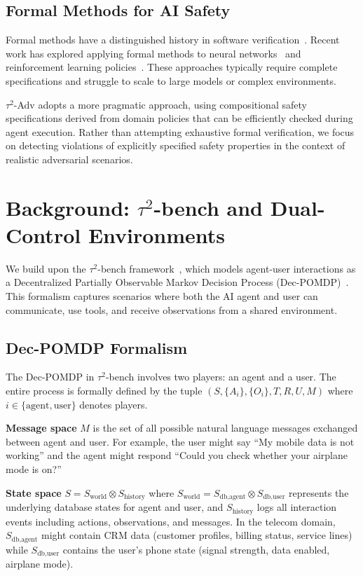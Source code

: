 \documentclass{article}
\newcommand{\tauadv}{$\tau^2$-Adv}
\newcommand{\taubench}{$\tau^2$-bench}
\begin{document}
\subsection{Formal Methods for AI Safety}

Formal methods have a distinguished history in software verification~\cite{clarke1999model,hoare1969axiomatic}. Recent work has explored applying formal methods to neural networks~\cite{katz2017reluplex,singh2019abstract} and reinforcement learning policies~\cite{alshiekh2018safe,jansen2020safe}. These approaches typically require complete specifications and struggle to scale to large models or complex environments.

\tauadv{} adopts a more pragmatic approach, using compositional safety specifications derived from domain policies that can be efficiently checked during agent execution. Rather than attempting exhaustive formal verification, we focus on detecting violations of explicitly specified safety properties in the context of realistic adversarial scenarios.

\section{Background: \taubench{} and Dual-Control Environments}

We build upon the \taubench{} framework~\cite{barres2025tau2}, which models agent-user interactions as a Decentralized Partially Observable Markov Decision Process (Dec-POMDP)~\cite{oliehoek2016concise}. This formalism captures scenarios where both the AI agent and user can communicate, use tools, and receive observations from a shared environment.

\subsection{Dec-POMDP Formalism}

The Dec-POMDP in \taubench{} involves two players: an agent and a user. The entire process is formally defined by the tuple $(S, \{A_i\}, \{O_i\}, T, R, U, M)$ where $i \in \{\text{agent}, \text{user}\}$ denotes players.

\textbf{Message space} $M$ is the set of all possible natural language messages exchanged between agent and user. For example, the user might say ``My mobile data is not working'' and the agent might respond ``Could you check whether your airplane mode is on?''

\textbf{State space} $S = S_{\text{world}} \otimes S_{\text{history}}$ where $S_{\text{world}} = S_{\text{db,agent}} \otimes S_{\text{db,user}}$ represents the underlying database states for agent and user, and $S_{\text{history}}$ logs all interaction events including actions, observations, and messages. In the telecom domain, $S_{\text{db,agent}}$ might contain CRM data (customer profiles, billing status, service lines) while $S_{\text{db,user}}$ contains the user's phone state (signal strength, data enabled, airplane mode).
\end{document}
